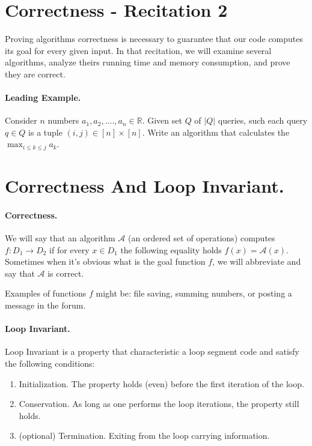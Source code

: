 
\section{Correctness - Recitation 2} 
\author{Correctness proofs and computational complexity. }

 
\begin{paragraph}
    Proving algorithms correctness is necessary to guarantee that our code computes its goal for every given input. In that recitation, we will examine several algorithms, analyze theirs running time and memory consumption, and prove they are correct.   
\end{paragraph}


\paragraph{Leading Example.}
Consider \(n\) numbers \(a_1,a_2,....,a_n \in \mathbb{R}\). Given set \(Q\) of \(|Q|\) queries, such each query \(q \in Q\) is a tuple \( (i,j) \in [n] \times [n] \). Write an algorithm that calculates the \(\max_{i\le k\le j}{a_k} \). 

\section{Correctness And Loop Invariant.}

\paragraph{Correctness.} We will say that an algorithm \( \mathcal{A}\) (an ordered set of operations) computes \( f:D_1 \rightarrow D_2 \) if for every \(x \in D_1\) the following equality holds \(f(x) = \mathcal{A}(x)\). Sometimes when it's obvious what is the goal function \(f\), we will abbreviate and say that \( \mathcal{A}\) is correct.       

Examples of functions \(f\) might be: file saving, summing numbers, or posting a message in the forum.  

\paragraph{Loop Invariant.} Loop Invariant is a property that characteristic a loop segment code  and satisfy the following conditions: 
\begin{enumerate}
    \item Initialization. The property holds (even) before the first iteration of the loop.   
    \item Conservation. As long as one performs the loop iterations, the property still holds.
    \item (optional) Termination. Exiting from the loop carrying information.
\end{enumerate}

